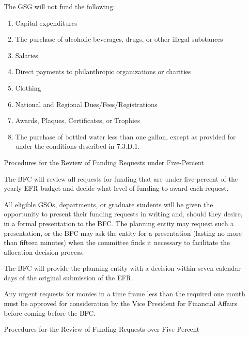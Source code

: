 \begin{bylaws-number}
\begin{bylaws-number}
  \item The GSG will not fund the following:
\begin{enumerate}[i]
  \item Capital expenditures
  \item The purchase of alcoholic beverages, drugs, or other illegal substances
  \item Salaries
  \item Direct payments to philanthropic organizations or charities
  \item Clothing
  \item National and Regional Dues/Fees/Registrations
  \item Awards, Plaques, Certificates, or Trophies
  \item The purchase of bottled water less than one gallon, except as provided for under the conditions described in 7.3.D.1.
\end{enumerate}
\end{bylaws-number}
  \item Procedures for the Review of Funding Requests under Five-Percent
\begin{bylaws-number}
  \item The BFC will review all requests for funding that are under five-percent of the yearly EFR budget and decide what level of funding to award each request.
  \item All eligible GSOs, departments, or graduate students will be given the opportunity to present their funding requests in writing and, should they desire, in a formal presentation to the BFC. The planning entity may request such a presentation, or the BFC may ask the entity for a presentation (lasting no more than fifteen minutes) when the committee finds it necessary to facilitate the allocation decision process.
  \item The BFC will provide the planning entity with a decision within seven calendar days of the original submission of the EFR.
  \item Any urgent requests for monies in a time frame less than the required one month must be approved for consideration by the Vice President for Financial Affairs before coming before the BFC.
\end{bylaws-number}
  \item Procedures for the Review of Funding Requests over Five-Percent
\begin{bylaws-number}

\end{bylaws-number}
\end{bylaws-number}
